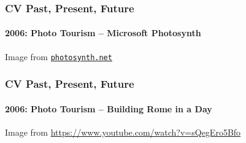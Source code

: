 \documentclass[xetex,professionalfont]{beamer}
\begin{document}

\begin{frame}
\frametitle{CV Past, Present, Future}
\framesubtitle{2006: Photo Tourism -- Microsoft Photosynth}

\begin{center}
    {\centering Image from \href{https://photosynth.net/}{\texttt{photosynth.net}}}
\end{center}

\end{frame}


\begin{frame}
\frametitle{CV Past, Present, Future}
\framesubtitle{2006: Photo Tourism -- Building Rome in a Day}

\begin{center}
    {\centering Image from \url{https://www.youtube.com/watch?v=sQegEro5Bfo}}
\end{center}

\end{frame}

\end{document}
